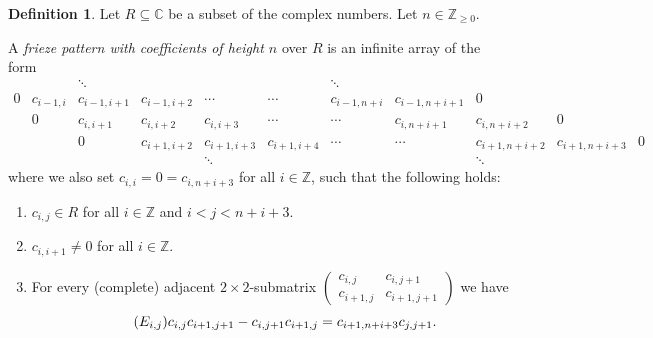 \documentclass[10pt]{amsart}
\numberwithin{equation}{section}
\theoremstyle{definition}
\newtheorem{defi}[theo]{Definition}
\theoremstyle{remark}
\newcommand{\CC }{\mathbb{C}}
\begin{document}
\begin{defi} \label{def:frieze}
Let $R\subseteq\CC$ be a subset of the complex numbers.
Let $n\in \mathbb{Z}_{\ge 0}$.

A \emph{frieze pattern with coefficients of height $n$} over $R$ 
is an infinite array of the form
\[
\begin{array}{ccccccccccc}
 && \ddots  & & & &\ddots  & & \\
0 & c_{i-1,i} & c_{i-1,i+1} & c_{i-1,i+2} & \cdots & \cdots & c_{i-1,n+i} & c_{i-1,n+i+1} & 0 & & \\
& 0 & c_{i,i+1} & c_{i,i+2} & c_{i,i+3} & \cdots & \cdots & c_{i,n+i+1} & c_{i,n+i+2} & 0 & \\
& & 0 & c_{i+1,i+2} & c_{i+1,i+3} & c_{i+1,i+4} & \cdots & \cdots & c_{i+1,n+i+2} & c_{i+1,n+i+3} & 0 \\
 & & & & \ddots & & & &\ddots & 
\end{array}
\]
where we also set $c_{i,i}=0=c_{i,n+i+3}$ for all $i\in \mathbb{Z}$,
such that the following holds:
\begin{enumerate}[label=(\arabic*)]
 \item %
 $c_{i,j}\in R$ for all $i\in\mathbb{Z}$ and $i< j< n+i+3$.
 \item %
 $c_{i,i+1}\neq 0$ for all $i\in \mathbb{Z}$.
 \item %
 For every
(complete) adjacent $2\times 2$-submatrix $\begin{pmatrix} c_{i,j} & c_{i,j+1}\\
c_{i+1,j} & c_{i+1,j+1} \end{pmatrix}$ we have
\begin{equation*}\tag{$E_{i,j}$}\label{eq:local}
c_{i,j} c_{i+1,j+1} - c_{i,j+1}c_{i+1,j} = c_{i+1,n+i+3}c_{j,j+1}.
\end{equation*}
\end{enumerate}
\end{defi}
\end{document}
